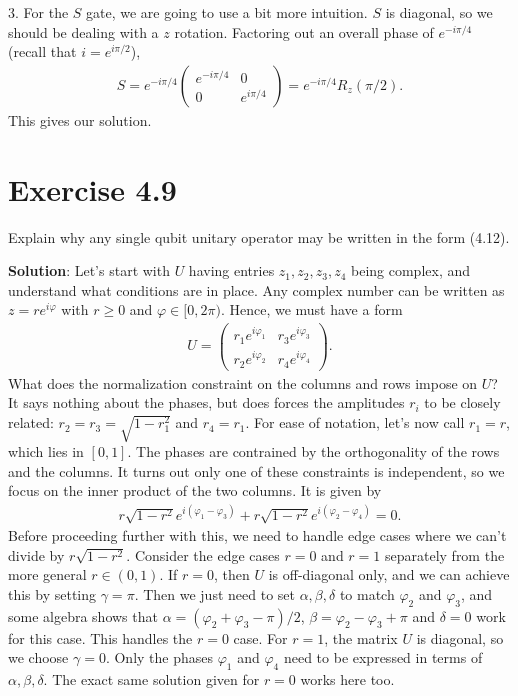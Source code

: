 \documentclass{book}
\begin{document}
    3. For the $S$ gate, we are going to use a bit more intuition. $S$ is diagonal, so we should be dealing with a $z$ rotation. Factoring out an overall phase of $e^{-i\pi/4}$ (recall that $i = e^{i\pi/2}$),
    \begin{align}
        S = e^{-i\pi/4}\begin{pmatrix}
            e^{-i\pi/4} & 0 \\
            0 & e^{i\pi/4}
        \end{pmatrix} = e^{-i\pi/4} R_z(\pi/2).
    \end{align}
    This gives our solution.
    
\section*{Exercise 4.9} 
    Explain why any single qubit unitary operator may be written in the form (4.12).
    
    \textbf{Solution}: Let's start with $U$ having entries $z_1, z_2, z_3, z_4$ being complex, and understand what conditions are in place. Any complex number can be written as $z = re^{i\varphi}$ with $r\geq 0$ and $\varphi \in [0,2\pi)$. Hence, we must have a form
    \begin{align}
        U = \begin{pmatrix}
            r_1 e^{i\varphi_1} & r_3 e^{i\varphi_3} \\
            r_2 e^{i\varphi_2} & r_4 e^{i\varphi_4}
        \end{pmatrix}.
    \end{align}
    What does the normalization constraint on the columns and rows impose on $U$? It says nothing about the phases, but does forces the amplitudes $r_i$ to be closely related: $r_2 = r_3 = \sqrt{1-r_1^2}$ and $r_4 = r_1$. For ease of notation, let's now call $r_1 = r$, which lies in $[0,1]$. The phases are contrained by the orthogonality of the rows and the columns. It turns out only one of these constraints is independent, so we focus on the inner product of the two columns. It is given by
    \begin{align} \label{eq:U_inn_prod}
        r\sqrt{1-r^2} e^{i(\varphi_1-\varphi_3)} + r\sqrt{1-r^2} e^{i(\varphi_2-\varphi_4)} = 0.
    \end{align}
    Before proceeding further with this, we need to handle edge cases where we can't divide by $r\sqrt{1-r^2}$. Consider the edge cases $r=0$ and $r=1$ separately from the more general $r \in (0,1)$. If $r=0$, then $U$ is off-diagonal only, and we can achieve this by setting $\gamma = \pi$. Then we just need to set $\alpha, \beta, \delta$ to match $\varphi_2$ and $\varphi_3$, and some algebra shows that $\alpha = (\varphi_2 + \varphi_3 -\pi)/2$, $\beta = \varphi_2 - \varphi_3 + \pi$ and $\delta = 0$ work for this case. This handles the $r = 0$ case. For $r = 1$, the matrix $U$ is diagonal, so we choose $\gamma = 0$. Only the phases $\varphi_1$ and $\varphi_4$ need to be expressed in terms of $\alpha, \beta, \delta$. The exact same solution given for $r = 0$ works here too. 
    
\end{document}
